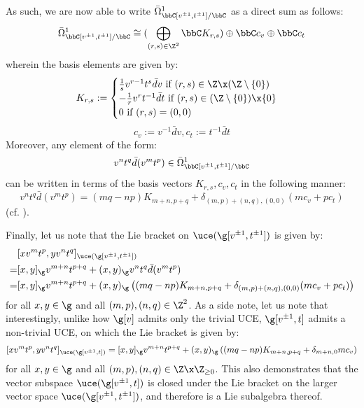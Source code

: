 \begin{example}
$$                $$
            As such, we are now able to write $\bar{\Omega}^1_{\bbC[v^{\pm 1}, t^{\pm 1}]/\bbC}$ as a direct sum as follows:
                $$\bar{\Omega}^1_{\bbC[v^{\pm 1}, t^{\pm 1}]/\bbC} \cong ( \bigoplus_{(r, s) \in \Z^2} \bbC K_{r, s}) \oplus \bbC c_v \oplus \bbC c_t$$
            wherein the basis elements are given by:
                $$
                    K_{r, s} :=
                    \begin{cases}
                        \text{$\frac1s v^{r - 1} t^s \bar{d}v$ if $(r, s) \in \Z \x (\Z \setminus \{0\})$}
                        \\
                        \text{$-\frac1r v^r t^{-1} \bar{d}t$ if $(r, s) \in (\Z \setminus \{0\}) \x \{0\}$}
                        \\
                        \text{$0$ if $(r, s) = (0, 0)$}
                    \end{cases}
                $$
                $$c_v := v^{-1} \bar{d}v, c_t := t^{-1} \bar{d}t$$
            Moreover, any element of the form:
                $$v^n t^q \bar{d}(v^m t^p) \in \bar{\Omega}^1_{\bbC[v^{\pm 1}, t^{\pm 1}]/\bbC}$$
            can be written in terms of the basis vectors $K_{r, s}, c_v, c_t$ in the following manner:
                $$v^n t^q \bar{d}(v^m t^p) = (mq - np) K_{m + n, p + q} + \delta_{(m, p) + (n, q), (0, 0)} ( m c_v + p c_t )$$
            (cf. \cite[p. 35]{wendlandt_formal_shift_operators_on_yangian_doubles}).

            Finally, let us note that the Lie bracket on $\uce(\g[v^{\pm 1}, t^{\pm 1}])$ is given by:
                $$
                    \begin{aligned}
                        & [x v^m t^p, y v^n t^q]_{\uce(\g[v^{\pm 1}, t^{\pm 1}])}
                        \\
                        = & [x, y]_{\g} v^{m + n} t^{p + q} + (x, y)_{\g} v^n t^q \bar{d}(v^m t^p)
                        \\
                        = & [x, y]_{\g} v^{m + n} t^{p + q} + (x, y)_{\g} \left( (mq - np) K_{m + n, p + q} + \delta_{(m, p) + (n, q), (0, 0)} ( m c_v + p c_t ) \right)
                    \end{aligned}
                $$
            for all $x, y \in \g$ and all $(m, p), (n, q) \in \Z^2$. As a side note, let us note that interestingly, unlike how $\g[v]$ admits only the trivial UCE, $\g[v^{\pm 1}, t]$ admits a non-trivial UCE, on which the Lie bracket is given by:
                $$[x v^m t^p, y v^n t^q]_{\uce(\g[v^{\pm 1}, t])} = [x, y]_{\g} v^{m + n} t^{p + q} + (x, y)_{\g} \left( (mq - np) K_{m + n, p + q} + \delta_{m + n, 0} m c_v \right)$$
            for all $x, y \in \g$ and all $(m, p), (n, q) \in \Z \x \Z_{\geq 0}$. This also demonstrates that the vector subspace $\uce(\g[v^{\pm 1}, t])$ is closed under the Lie bracket on the larger vector space $\uce(\g[v^{\pm 1}, t^{\pm 1}])$, and therefore is a Lie subalgebra thereof.
        \end{example}